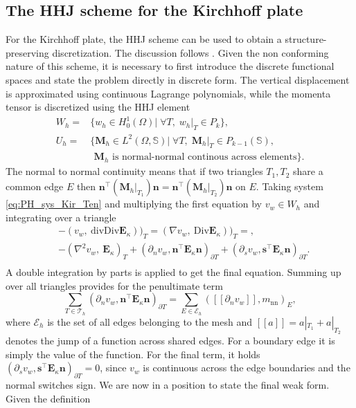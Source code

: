 \documentclass{ifacconf}
\begin{document}
\subsection{The HHJ scheme for the Kirchhoff plate}\label{sec:HHJ}
For the Kirchhoff plate, the HHJ scheme can be used to obtain a structure-preserving discretization. The discussion follows \cite{arnold2019hellan}. Given the non conforming nature of this scheme, it is necessary to first introduce the discrete functional spaces and state the problem directly in discrete form. The vertical displacement is approximated using continuous Lagrange polynomials, while the momenta tensor is discretized using the HHJ element
\begin{equation}
\label{eq:HHJ}
\begin{aligned}
W_h = &\{w_h \in H^1_0(\Omega)| \; \forall T, \; w_h|_{T} \in P_{k} \}, \\
U_h = &\{\bm{M}_h \in L^2(\Omega, \mathbb{S})| \; \forall T, \; \bm{M}_h|_{T} \in P_{k-1}(\mathbb{S}) , \\ 
&\, \ \bm{M}_h \text{ is normal-normal continous across elements}\}.
\end{aligned}
\end{equation}
The normal to normal continuity means that if two triangles $T_1, T_2$ share a common edge $E$ then $\bm{n}^\top (\bm{M}_h|_{T_1}) \bm{n} = \bm{n}^\top (\bm{M}_h|_{T_2}) \bm{n}$ on $E$. Taking system \eqref{eq:PH_sys_Kir_Ten} and multiplying the first equation by $v_w \in W_h$ and integrating over a triangle
\begin{equation*}
	\begin{aligned}
	& - (v_w, \ \mathrm{div}\mathrm{Div} \bm{E}_\kappa))_{T} = (\nabla v_w, \ \mathrm{Div} \bm{E}_\kappa))_{T}=, \\
	& -(\nabla^2 v_w, \ \bm{E}_\kappa)_T + (\partial_n v_w, \bm{n}^\top\bm{E}_\kappa \bm{n})_{\partial T} + (\partial_s v_w, \bm{s}^\top\bm{E}_\kappa \bm{n})_{\partial T}. \\
	\end{aligned}
\end{equation*}
A double integration by parts is applied to get the final equation. Summing up over all triangles provides for the penultimate term
\begin{equation*}
\sum_{T \in \mathcal{T}_h} (\partial_n v_w, \bm{n}^\top\bm{E}_\kappa \bm{n})_{\partial T} = \sum_{E \in \mathcal{E}_h} ([\![\partial_n v_w]\!], m_{\text{nn}})_{E},
\end{equation*} 
where $\mathcal{E}_h$ is the set of all edges belonging to the mesh and $[\![a]\!] = a|_{T_1} + a|_{T_2}$ denotes the jump of a function across shared edges. For a boundary edge it is simply the value of the function. For the final term, it holds $(\partial_s v_w, \bm{s}^\top\bm{E}_\kappa \bm{n})_{\partial T}=0$, since $v_w$ is continuous across the edge boundaries and the normal switches sign. We are now in a position to state the final weak form. Given the definition
\end{document}
